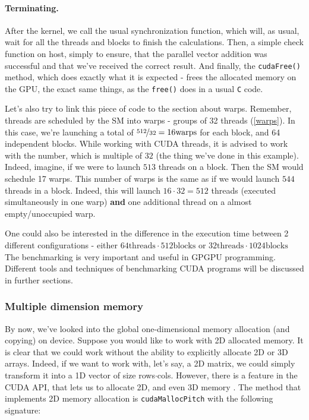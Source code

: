 \vspace{-0.8cm}
\paragraph{Terminating.} After the kernel, we call the usual synchronization function, which will, as usual, wait for all the threads and blocks 
to finish the calculations. 
Then, a simple check function on host, simply to ensure, that the parallel vector addition was successful and that we've received the correct result.
And finally, the \verb|cudaFree()| method, which does exactly what it is expected - 
frees the allocated memory on the GPU, the exact same things, as the \verb|free()| does in a usual \verb|C| code.

Let's also try to link this piece of code to the section about warps. Remember, 
threads are scheduled by the SM into warps - groups of 32 threads (\autoref{warps}). 
In this case, we're launching a total of $\nicefrac{512}{32} = 16 \text{warps}$ for each 
block, and 64 independent blocks. While working with CUDA threads, it is advised to work with 
the number, which is multiple of $32$ (the thing we've done in this example). Indeed, imagine, if we were to launch $513$ threads on a block.
Then the SM would schedule 17 warps. This number of warps is the same as if we would launch $544$ threads in a block.
Indeed, this will launch $16\cdot 32 = 512$ threads (executed simultaneously in one warp) \textbf{and} 
one additional thread on a almost empty/unoccupied warp. 

One could also be interested in the difference in the execution time between 2 different
 configurations - either $64\text{threads}\cdot 512\text{blocks}$ or $32\text{threads}\cdot 1024\text{blocks}$
 The benchmarking is very important and useful in GPGPU programming. Different tools and techniques of 
 benchmarking CUDA programs will be discussed in further sections.

\subsubsection{Multiple dimension memory}
By now, we've looked into the global one-dimensional 
memory allocation (and copying) on device. Suppose you would like to work 
with 2D allocated memory. It is clear that we could work without the ability to explicitly allocate 2D or 3D arrays. 
Indeed, if we want to work with, let's say, a 2D matrix, we could simply 
transform it into a 1D vector of size rows$\cdot$cols.
However, there is a feature in the CUDA API, that lets us to allocate 2D, and even 
3D memory \cite{MemoryAlignment}. 
The method that implements 2D memory allocation is \verb|cudaMallocPitch| with the following signature:


